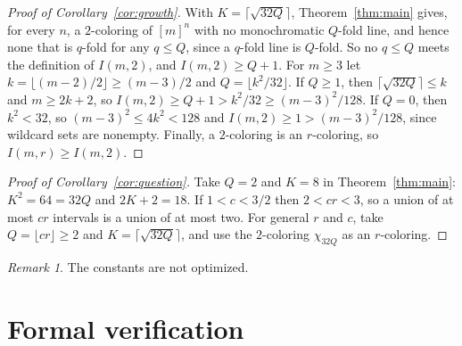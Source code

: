 \documentclass[11pt]{article}
\theoremstyle{remark}
\newtheorem*{remark}{Remark}
\begin{document}
\begin{proof}[Proof of Corollary~\ref{cor:growth}]
With $K=\lceil\sqrt{32Q}\rceil$, Theorem~\ref{thm:main} gives, for every $n$, a $2$-coloring of $[m]^n$ with no monochromatic $Q$-fold line, and hence none that is $q$-fold for any $q\le Q$, since a $q$-fold line is $Q$-fold. So no $q\le Q$ meets the definition of $I(m,2)$, and $I(m,2)\ge Q+1$. For $m\ge3$ let $k=\lfloor(m-2)/2\rfloor\ge(m-3)/2$ and $Q=\lfloor k^2/32\rfloor$. If $Q\ge1$, then $\lceil\sqrt{32Q}\rceil\le k$ and $m\ge2k+2$, so $I(m,2)\ge Q+1>k^2/32\ge(m-3)^2/128$. If $Q=0$, then $k^2<32$, so $(m-3)^2\le4k^2<128$ and $I(m,2)\ge1>(m-3)^2/128$, since wildcard sets are nonempty. Finally, a $2$-coloring is an $r$-coloring, so $I(m,r)\ge I(m,2)$.
\end{proof}

\begin{proof}[Proof of Corollary~\ref{cor:question}]
Take $Q=2$ and $K=8$ in Theorem~\ref{thm:main}: $K^2=64=32Q$ and $2K+2=18$. If $1<c<3/2$ then $2<cr<3$, so a union of at most $cr$ intervals is a union of at most two. For general $r$ and $c$, take $Q=\lfloor cr\rfloor\ge2$ and $K=\lceil\sqrt{32Q}\rceil$, and use the $2$-coloring $\chi_{32Q}$ as an $r$-coloring.
\end{proof}

\begin{remark}
The constants are not optimized.
\end{remark}

\section{Formal verification}\label{sec:lean}
\end{document}
